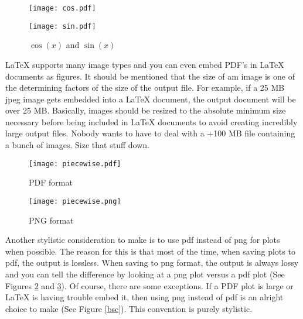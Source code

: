\documentclass[11pt,letterpaper]{article}
\begin{document}
\begin{figure}
    \centering
    \begin{minipage}[t]{0.45\textwidth}
        \centering
        \texttt{[image: cos.pdf]}
    \end{minipage}
    \hspace{0.5cm}
    \begin{minipage}[t]{0.45\textwidth}
        \centering
        \texttt{[image: sin.pdf]}
    \end{minipage}
    \caption{$\cos(x)$ and $\sin(x)$}
    \label{sincos}
\end{figure}

LaTeX supports many image types and you can even embed PDF's in LaTeX documents
as figures. It should be mentioned that the size of am image is one of the
determining factors of the size of the output file. For example, if a 25 MB jpeg
image gets embedded into a LaTeX document, the output document will be over 25
MB. Basically, images should be resized to the absolute minimum size necessary
before being included in LaTeX documents to avoid creating incredibly large
output files. Nobody wants to have to deal with a +100 MB file containing a
bunch of images. Size that stuff down.\\

\begin{figure}
    \centering
    \texttt{[image: piecewise.pdf]}
    \caption{PDF format}
    \label{pdfformat}
\end{figure}
\begin{figure}
    \centering
    \texttt{[image: piecewise.png]}
    \caption{PNG format}
    \label{pngformat}
\end{figure}

Another stylistic consideration to make is to use pdf instead of png for plots
when possible. The reason for this is that most of the time, when saving plots
to pdf, the output is lossless. When saving to png format, the output is always
lossy and you can tell the difference by looking at a png plot versus a pdf
plot (See Figures \ref{pdfformat} and \ref{pngformat}). Of course, there are
some exceptions. If a PDF plot is large or LaTeX is having trouble embed it,
then using png instead of pdf is an alright choice to make (See Figure
\ref{bsc}). This convention is purely stylistic.\\
\end{document}
